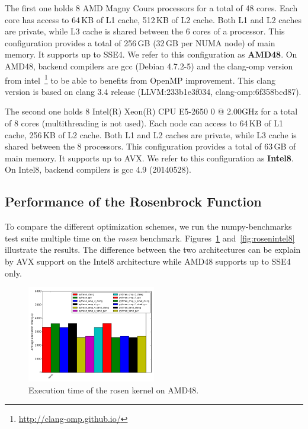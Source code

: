 \documentclass[10pt, preprint]{sigplanconf}
\begin{document}
The first one holds 8 AMD Magny Cours processors for a
total of 48 cores. Each core has access to 64\,KB of L1 cache,
512\,KB of L2 cache. Both L1 and L2 caches are private, while L3 cache
is shared between the 6 cores of a processor. This configuration
provides a total of 256\,GB (32\,GB per NUMA node) of main memory. It supports
up to SSE4. We refer to this configuration as \textbf{AMD48}.
On AMD48, backend compilers are gcc (Debian 4.7.2-5) and the clang-omp version
from intel~\footnote{\url{http://clang-omp.github.io/}} to be able to benefits
from OpenMP improvement. This clang version is based on clang 3.4 release
(LLVM:233b1e3f034, clang-omp:6f358bcd87).

The second one holds 8 Intel(R) Xeon(R) CPU E5-2650 0 @ 2.00GHz for a total of
8 cores (multithreading is not used). Each node can access to  64\,KB of L1 cache,
256\,KB of L2 cache. Both L1 and L2 caches are private, while L3 cache
is shared between the 8 processors. This configuration
provides a total of 63\,GB of main memory. It supports up to AVX. We
refer to this configuration as \textbf{Intel8}.
On Intel8, backend compilers is gcc 4.9 (20140528).


\subsection{Performance of the Rosenbrock Function}

To compare the different optimization schemes, we run the numpy-benchmarks test
suite multiple time on the \textit{rosen} benchmark.
Figures~\ref{fig:rosenamd48} and~\ref{fig:rosenintel8} illustrate the results.
The difference between the two architectures can be explain by AVX support on
the Intel8 architecture while AMD48 supports up to SSE4 only.

\begin{figure}[t]
\centering
\includegraphics[width=0.5\textwidth]{rosen_amd48.png}
\caption{Execution time of the rosen kernel on AMD48.}
\label{fig:rosenamd48}
\end{figure}
\end{document}
